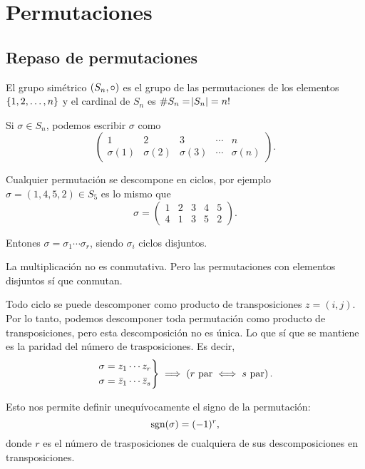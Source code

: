 \chapter{Permutaciones}

\section{Repaso de permutaciones}

El grupo simétrico $\left( S_n, \circ \right)$ es el grupo de las permutaciones de los elementos
$\left\{1, 2, \dots, n\right\}$ y el cardinal de $S_n$ es $\# S_n = \abs{S_n} = n!$

Si $\sigma \in S_n$, podemos escribir $\sigma$ como
\[
    \begin{pmatrix}
        1 & 2 & 3 & \cdots & n \\
        \sigma(1) & \sigma(2) & \sigma(3) & \cdots & \sigma(n)
    \end{pmatrix}.
\]

Cualquier permutación se descompone en ciclos, por ejemplo
$\sigma = (1, 4, 5, 2) \in S_5$ es lo mismo que
\[
    \sigma = 
    \begin{pmatrix}
        1 & 2 & 3 & 4 & 5 \\
        4 & 1 & 3 & 5 & 2
    \end{pmatrix}.
\]

Entones $\sigma = \sigma_1 \cdots \sigma_r$, siendo $\sigma_i$ ciclos disjuntos.

\begin{obs}
    La multiplicación no es conmutativa. Pero las permutaciones con elementos disjuntos sí que conmutan.
\end{obs}

Todo ciclo se puede descomponer como producto de transposiciones $z = (i, j)$.
Por lo tanto, podemos descomponer toda permutación como producto de transposiciones, pero esta
descomposición no es única.
Lo que sí que se mantiene es la paridad del número de trasposiciones. Es decir,
\[
    \begin{rcases}
        \sigma = z_1 \cdots z_r \\
        \sigma = \bar{z}_1 \cdots \bar{z}_s
    \end{rcases} \implies \left( r \text{ par} \iff s \text{ par}\right).
\]

Esto nos permite definir unequívocamente el signo de la permutación:
\[
    \text{sgn}(\sigma) = (-1)^{r},
\]
donde $r$ es el número de trasposiciones de cualquiera de sus descomposiciones en transposiciones.

